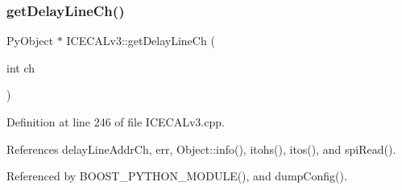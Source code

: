 \subsubsection{\texorpdfstring{get\+Delay\+Line\+Ch()}{getDelayLineCh()}}
{\footnotesize\ttfamily Py\+Object $\ast$ I\+C\+E\+C\+A\+Lv3\+::get\+Delay\+Line\+Ch (\begin{DoxyParamCaption}\item[{int}]{ch }\end{DoxyParamCaption})}



Definition at line 246 of file I\+C\+E\+C\+A\+Lv3.\+cpp.



References delay\+Line\+Addr\+Ch, err, Object\+::info(), itohs(), itos(), and spi\+Read().



Referenced by B\+O\+O\+S\+T\+\_\+\+P\+Y\+T\+H\+O\+N\+\_\+\+M\+O\+D\+U\+L\+E(), and dump\+Config().


